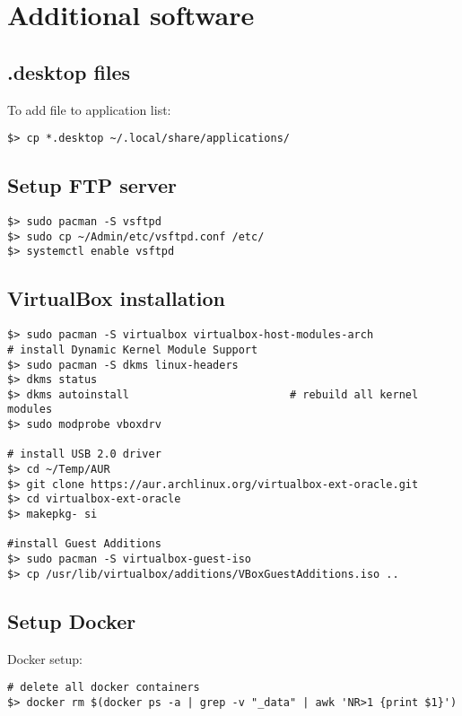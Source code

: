\documentclass[a4paper, 12pt]{article}
\begin{document}
\section{Additional software}

\subsection{.desktop files}
To add  file to application list:
\begin{lstlisting}
$> cp *.desktop ~/.local/share/applications/
\end{lstlisting}

\subsection{Setup FTP server}
\begin{lstlisting}
$> sudo pacman -S vsftpd
$> sudo cp ~/Admin/etc/vsftpd.conf /etc/
$> systemctl enable vsftpd
\end{lstlisting}

\subsection{VirtualBox installation}
\begin{lstlisting}
$> sudo pacman -S virtualbox virtualbox-host-modules-arch
# install Dynamic Kernel Module Support
$> sudo pacman -S dkms linux-headers
$> dkms status
$> dkms autoinstall                         # rebuild all kernel modules
$> sudo modprobe vboxdrv

# install USB 2.0 driver
$> cd ~/Temp/AUR
$> git clone https://aur.archlinux.org/virtualbox-ext-oracle.git
$> cd virtualbox-ext-oracle
$> makepkg- si

#install Guest Additions
$> sudo pacman -S virtualbox-guest-iso
$> cp /usr/lib/virtualbox/additions/VBoxGuestAdditions.iso ..
\end{lstlisting}

\subsection{Setup Docker}
Docker setup:
\begin{lstlisting}
# delete all docker containers
$> docker rm $(docker ps -a | grep -v "_data" | awk 'NR>1 {print $1}')
\end{lstlisting}
\end{document}
